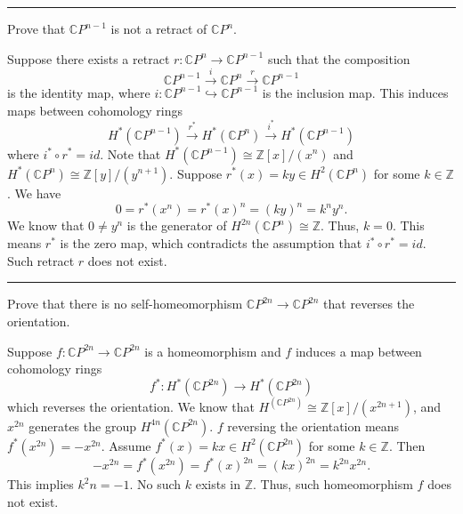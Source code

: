 \documentclass[letterpaper, 12pt]{article}
\begin{document}
\noindent\rule{7in}{2.8pt}
\begin{problem}{3}
Prove that \(\mathbb{C}P^{n-1}\) is not a retract of \(\mathbb{C}P^n\).
\end{problem}
\begin{solution}
Suppose there exists a retract \(r:\mathbb{C}P^n\rightarrow \mathbb{C}P^{n-1}\) such that the composition 
\[\mathbb{C}P^{n-1}\xrightarrow{i} \mathbb{C}P^n\xrightarrow{r}\mathbb{C}P^{n-1}\]
is the identity map, where \(i:\mathbb{C}P^{n-1}\hookrightarrow \mathbb{C}P^{n-1}\) is the inclusion map. This induces maps between cohomology rings 
\[H^*(\mathbb{C}P^{n-1})\xrightarrow{r^*}H^*(\mathbb{C}P^n)\xrightarrow{i^*}H^*(\mathbb{C}P^{n-1})\]
where \(i^*\circ r^*=id\). Note that \(H^*(\mathbb{C}P^{n-1})\cong \mathbb{Z}[x]/(x^n)\) and \(H^*(\mathbb{C}P^n)\cong \mathbb{Z}[y]/(y^{n+1})\). Suppose \(r^*(x)=ky\in H^2(\mathbb{C}P^n)\) for some \(k\in \mathbb{Z}\). We have 
\[0=r^*(x^n)=r^*(x)^n=(ky)^n=k^ny^n.\]
We know that \(0\neq y^n\) is the generator of \(H^{2n}(\mathbb{C}P^n)\cong \mathbb{Z}\). Thus, \(k=0\). This means \(r^*\) is the zero map, which contradicts the assumption that \(i^*\circ r^*=id\). Such retract \(r\) does not exist. 
\end{solution}

\noindent\rule{7in}{2.8pt}
\begin{problem}{4}
Prove that there is no self-homeomorphism \(\mathbb{C}P^{2n}\rightarrow \mathbb{C}P^{2n}\) that reverses the orientation. 
\end{problem}
\begin{solution}
Suppose \(f:\mathbb{C}P^{2n}\rightarrow \mathbb{C}P^{2n}\) is a homeomorphism and \(f\) induces a map between cohomology rings 
\[f^*:H^*(\mathbb{C}P^{2n})\rightarrow H^*(\mathbb{C}P^{2n})\]
which reverses the orientation. We know that \(H^(\mathbb{C}P^{2n})\cong \mathbb{Z}[x]/(x^{2n+1})\), and \(x^{2n}\) generates the group \(H^{4n}(\mathbb{C}P^{2n})\). \(f\) reversing the orientation means \(f^*(x^{2n})=-x^{2n}\). Assume \(f^*(x)=kx\in H^2(\mathbb{C}P^{2n})\) for some \(k\in \mathbb{Z}\). Then 
\[-x^{2n}=f^*(x^{2n})=f^*(x)^{2n}=(kx)^{2n}=k^{2n}x^{2n}.\]
This implies \(k^2n=-1\). No such \(k\) exists in \(\mathbb{Z}\). Thus, such homeomorphism \(f\) does not exist. 
\end{solution}
\end{document}
